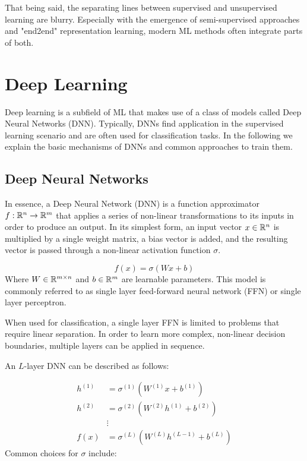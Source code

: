 That being said, the separating lines between supervised and unsupervised learning are blurry. Especially with the emergence of semi-supervised approaches and "end2end" representation learning, modern ML methods often integrate parts of both.

\section{Deep Learning}
\label{sec:dl}
Deep learning is a subfield of ML that makes use of a class of models called Deep Neural Networks (DNN). Typically, DNNs find application in the supervised learning scenario and are often used for classification tasks. In the following we explain the basic mechanisms of DNNs and common approaches to train them.

\subsection{Deep Neural Networks}
In essence, a Deep Neural Network (DNN) is a function approximator $f: \mathbb{R}^n \rightarrow \mathbb{R}^m$ that applies a series of non-linear transformations to its inputs in order to produce an output. In its simplest form, an input vector $x \in \mathbb{R}^n$ is multiplied by a single weight matrix, a bias vector is added, and the resulting vector is passed through a non-linear activation function $\sigma$.

\begin{equation}
    f(x) = \sigma(W x + b)
\end{equation}
Where $W \in \mathbb{R}^{m \times n}$ and $b \in \mathbb{R}^{m}$ are learnable parameters.
This model is commonly referred to as single layer feed-forward neural network (FFN) or single layer perceptron.

When used for classification, a single layer FFN is limited to problems that require linear separation. In order to learn more complex, non-linear decision boundaries, multiple layers can be applied in sequence.

An $L$-layer DNN can be described as follows:

\begin{equation}
    \label{eq:DNN}
    \begin{split}
        h^{(1)} &= \sigma^{(1)}(W^{(1)} x + b^{(1)}) \\
        h^{(2)} &= \sigma^{(2)}(W^{(2)} h^{(1)} + b^{(2)}) \\
        & \vdots \\
        f(x) &= \sigma^{(L)}(W^{(L)} h^{(L-1)} + b^{(L)})
    \end{split}
\end{equation}
Common choices for $\sigma$ include:

